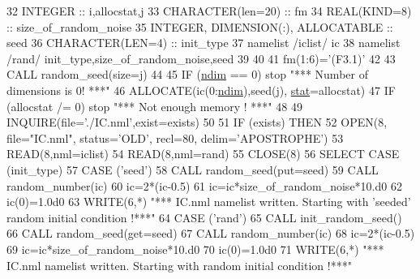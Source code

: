 \begin{DoxyCode}
32     \textcolor{keywordtype}{INTEGER} :: i,allocstat,j
33     \textcolor{keywordtype}{CHARACTER(len=20)} :: fm
34     \textcolor{keywordtype}{REAL(KIND=8)} :: size\_of\_random\_noise
35     \textcolor{keywordtype}{INTEGER}, \textcolor{keywordtype}{DIMENSION(:)}, \textcolor{keywordtype}{ALLOCATABLE} :: seed
36     \textcolor{keywordtype}{CHARACTER(LEN=4)} :: init\_type 
37     namelist /iclist/ ic
38     namelist /rand/ init\_type,size\_of\_random\_noise,seed
39 
40 
41     fm(1:6)=\textcolor{stringliteral}{'(F3.1)'}
42 
43     \textcolor{keyword}{CALL }random\_seed(size=j)
44    
45     \textcolor{keywordflow}{IF} (\hyperlink{namespaceparams_a2323fe1773f086e20c14f266351c482b}{ndim} == 0) stop \textcolor{stringliteral}{"*** Number of dimensions is 0! ***"}
46     \textcolor{keyword}{ALLOCATE}(ic(0:\hyperlink{namespaceparams_a2323fe1773f086e20c14f266351c482b}{ndim}),seed(j), \hyperlink{namespacestat}{stat}=allocstat)
47     \textcolor{keywordflow}{IF} (allocstat /= 0) stop \textcolor{stringliteral}{"*** Not enough memory ! ***"}
48 
49     \textcolor{keyword}{INQUIRE}(file=\textcolor{stringliteral}{'./IC.nml'},exist=exists)
50 
51     \textcolor{keywordflow}{IF} (exists) \textcolor{keywordflow}{THEN}
52        \textcolor{keyword}{OPEN}(8, file=\textcolor{stringliteral}{"IC.nml"}, status=\textcolor{stringliteral}{'OLD'}, recl=80, delim=\textcolor{stringliteral}{'APOSTROPHE'})
53        \textcolor{keyword}{READ}(8,nml=iclist)
54        \textcolor{keyword}{READ}(8,nml=rand)
55        \textcolor{keyword}{CLOSE}(8)
56        \textcolor{keywordflow}{SELECT CASE} (init\_type)
57          \textcolor{keywordflow}{CASE} (\textcolor{stringliteral}{'seed'})
58            \textcolor{keyword}{CALL }random\_seed(put=seed)
59            \textcolor{keyword}{CALL }random\_number(ic)
60            ic=2*(ic-0.5)
61            ic=ic*size\_of\_random\_noise*10.d0
62            ic(0)=1.0d0
63            \textcolor{keyword}{WRITE}(6,*) \textcolor{stringliteral}{"*** IC.nml namelist written. Starting with 'seeded' random initial condition !***"}
64          \textcolor{keywordflow}{CASE} (\textcolor{stringliteral}{'rand'})
65            \textcolor{keyword}{CALL }init\_random\_seed()
66            \textcolor{keyword}{CALL }random\_seed(get=seed)
67            \textcolor{keyword}{CALL }random\_number(ic)
68            ic=2*(ic-0.5)
69            ic=ic*size\_of\_random\_noise*10.d0
70            ic(0)=1.0d0
71            \textcolor{keyword}{WRITE}(6,*) \textcolor{stringliteral}{"*** IC.nml namelist written. Starting with random initial condition !***"}

\end{DoxyCode}
